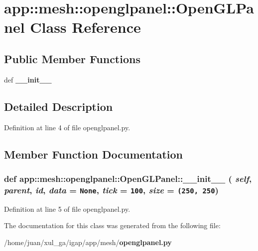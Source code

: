\section{app::mesh::openglpanel::OpenGLPanel Class Reference}
\label{classapp_1_1mesh_1_1openglpanel_1_1OpenGLPanel}
\subsection*{Public Member Functions}
\begin{CompactItemize}
\item 
def {\bf \_\-\_\-init\_\-\_\-}
\end{CompactItemize}


\subsection{Detailed Description}


Definition at line 4 of file openglpanel.py.

\subsection{Member Function Documentation}
\subsubsection{\setlength{\rightskip}{0pt plus 5cm}def app::mesh::openglpanel::OpenGLPanel::\_\-\_\-init\_\-\_\- ( {\em self},  {\em parent},  {\em id},  {\em data} = {\tt None},  {\em tick} = {\tt 100},  {\em size} = {\tt (250,~250})}\label{classapp_1_1mesh_1_1openglpanel_1_1OpenGLPanel_4df13594764c8330d5d4c0189e090fee}




Definition at line 5 of file openglpanel.py.

The documentation for this class was generated from the following file:\begin{CompactItemize}
\item 
/home/juan/xul\_\-ga/igap/app/mesh/{\bf openglpanel.py}\end{CompactItemize}
